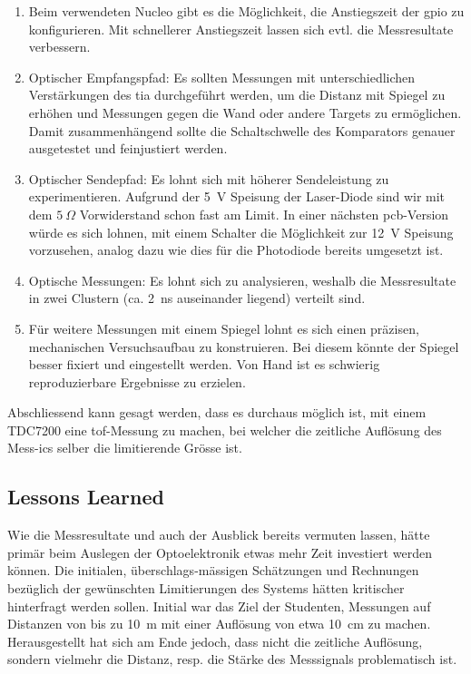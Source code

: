 \begin{enumerate}
    \item Beim verwendeten Nucleo gibt es die Möglichkeit, die Anstiegszeit der \acrshort{gpio} zu konfigurieren. Mit
          schnellerer Anstiegszeit lassen sich evtl. die Messresultate verbessern.
    \item Optischer Empfangspfad: Es sollten Messungen mit unterschiedlichen Verstärkungen des \acrshort{tia}
          durchgeführt werden, um die Distanz mit Spiegel zu erhöhen und Messungen gegen die Wand oder andere Targets zu
          ermöglichen. Damit zusammenhängend sollte die Schaltschwelle des Komparators genauer ausgetestet und
          feinjustiert werden.
    \item Optischer Sendepfad: Es lohnt sich mit höherer Sendeleistung zu experimentieren. Aufgrund der 5~V Speisung
          der Laser-Diode sind wir mit dem $5~\Omega$ Vorwiderstand schon fast am Limit. In einer nächsten
          \acrshort{pcb}-Version würde es sich lohnen, mit einem Schalter die Möglichkeit zur 12~V Speisung vorzusehen,
          analog dazu wie dies für die Photodiode bereits umgesetzt ist.
    \item Optische Messungen: Es lohnt sich zu analysieren, weshalb die Messresultate in zwei Clustern (ca. 2~ns
          auseinander liegend) verteilt sind.
    \item Für weitere Messungen mit einem Spiegel lohnt es sich einen präzisen, mechanischen Versuchsaufbau zu
          konstruieren. Bei diesem könnte der Spiegel besser fixiert und eingestellt werden. Von Hand ist es schwierig
          reproduzierbare Ergebnisse zu erzielen.
\end{enumerate}

Abschliessend kann gesagt werden, dass es durchaus möglich ist, mit einem TDC7200 eine \acrshort{tof}-Messung zu machen,
bei welcher die zeitliche Auflösung des Mess-\acrshort{ic}s selber die limitierende Grösse ist.

\subsection{Lessons Learned}

Wie die Messresultate und auch der Ausblick bereits vermuten lassen, hätte primär beim Auslegen der Optoelektronik etwas
mehr Zeit investiert werden können. Die initialen, überschlags-mässigen Schätzungen und Rechnungen bezüglich der
gewünschten Limitierungen des Systems hätten kritischer hinterfragt werden sollen. Initial war das Ziel der Studenten,
Messungen auf Distanzen von bis zu 10~m mit einer Auflösung von etwa 10~cm zu machen. Herausgestellt hat sich am Ende
jedoch, dass nicht die zeitliche Auflösung, sondern vielmehr die Distanz, resp. die Stärke des Messsignals problematisch
ist.

